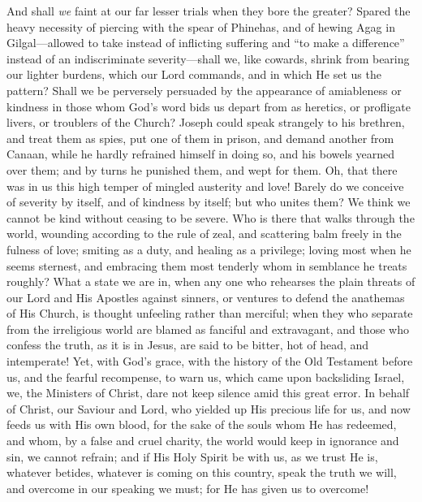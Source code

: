 And shall \emph{we} faint at our far lesser trials when they bore
the greater? Spared the heavy necessity of piercing with the spear of
Phinehas, and of hewing Agag in Gilgal—allowed to take instead of
inflicting suffering and ``to make a difference'' instead of
an indiscriminate severity—shall we, like cowards, shrink from
bearing our lighter burdens, which our Lord commands, and in which He
set us the pattern? Shall we be perversely persuaded by the appearance
of amiableness or kindness in those whom God's word bids us depart
from as heretics, or profligate livers, or troublers of the Church?
Joseph could speak strangely to his brethren, and treat them as spies,
put one of them in prison, and demand another from Canaan, while he
hardly refrained himself in doing so, and his bowels yearned over
them; and by turns he punished them, and wept for them. Oh, that there
was in us this high temper of mingled austerity and love! Barely do we
conceive of severity by itself, and of kindness by itself; but who
unites them? We think we cannot be kind without ceasing to be severe.
Who is there that walks through the world, wounding according to the
rule of zeal, and scattering balm freely in the fulness of love;
smiting as a duty, and healing as a privilege; loving most when he
seems sternest, and embracing them most tenderly whom in semblance he
treats roughly? What a state we are in, when any one who rehearses the
plain threats of our Lord and His Apostles against sinners, or
ventures to defend the anathemas of His Church, is thought unfeeling
rather than merciful; when they who separate from the irreligious
world are blamed as fanciful and extravagant, and those who confess
the truth, as it is in Jesus, are said to be bitter, hot of head, and
intemperate! Yet, with God's grace, with the history of the Old
Testament before us, and the fearful recompense, to warn us, which
came upon backsliding Israel, we, the Ministers of Christ, dare not
keep silence amid this great error. In behalf of Christ, our Saviour
and Lord, who yielded up His precious life for us, and now feeds us
with His own blood, for the sake of the souls whom He has redeemed,
and whom, by a false and cruel charity, the world would keep in
ignorance and sin, we cannot refrain; and if His Holy Spirit be with
us, as we trust He is, whatever betides, whatever is coming on this
country, speak the truth we will, and overcome in our speaking we
must; for He has given us to overcome!


